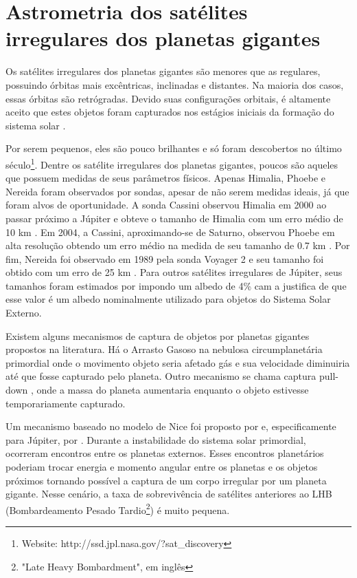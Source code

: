 \documentclass[12pt,a4paper]{monografia}
\begin{document}
\chapter{Astrometria dos sat\'elites irregulares dos planetas gigantes}
\label{Cap: Irr-astrometria}

\indent \indent Os satélites irregulares dos planetas gigantes são menores que as regulares, possuindo órbitas mais excêntricas, inclinadas e distantes. Na maioria dos casos, essas órbitas são retrógradas. Devido suas configurações orbitais, é altamente aceito que estes objetos foram capturados nos estágios iniciais da formação do sistema solar \citep{Sheppard2003}.

Por serem pequenos, eles são pouco brilhantes e só foram descobertos no último século\footnote{Website: http://ssd.jpl.nasa.gov/?sat\_discovery}. Dentre os satélite irregulares dos planetas gigantes, poucos são aqueles que possuem medidas de seus parâmetros físicos. Apenas Himalia, Phoebe e Nereida foram observados por sondas, apesar de não serem medidas ideais, já que foram alvos de oportunidade. A sonda Cassini observou Himalia em 2000 ao passar próximo a Júpiter e obteve o tamanho de Himalia com um erro médio de 10 km \citep{Porco2003}. Em 2004, a Cassini, aproximando-se de Saturno, observou Phoebe em alta resolução obtendo um erro médio na medida de seu tamanho de 0.7 km \citep{Thomas2010}. Por fim, Nereida foi observado em 1989 pela sonda Voyager 2 e seu tamanho foi obtido com um erro de 25 km \citep{Smith1989}. Para outros satélites irregulares de Júpiter, seus tamanhos foram estimados por \cite{Rettig2001} impondo um albedo de 4\% cam a justifica de que esse valor é um albedo nominalmente utilizado para objetos do Sistema Solar Externo.

Existem alguns mecanismos de captura de objetos por planetas gigantes propostos na literatura. Há o Arrasto Gasoso na nebulosa circumplanetária primordial \citep{Sheppard2005} onde o movimento objeto seria afetado gás e sua velocidade diminuiria até que fosse capturado pelo planeta. Outro mecanismo se chama captura pull-down \citep{Sheppard2005}, onde a massa do planeta aumentaria enquanto o objeto estivesse temporariamente capturado.

Um mecanismo baseado no modelo de Nice \citep{Morbidelli2005, Tsiganis2005, Gomes2005} foi proposto por \cite{Nesvorny2007} e, especificamente para Júpiter, por \citealp{Nesvorny2014}. Durante a instabilidade do sistema solar primordial, ocorreram encontros entre os planetas externos. Esses encontros planetários poderiam trocar energia e momento angular entre os planetas e os objetos próximos tornando possível a captura de um corpo irregular por um planeta gigante. Nesse cenário, a taxa de sobrevivência de satélites anteriores ao LHB (Bombardeamento Pesado Tardio\footnote{"Late Heavy Bombardment", em inglês}) é muito pequena.
\end{document}
